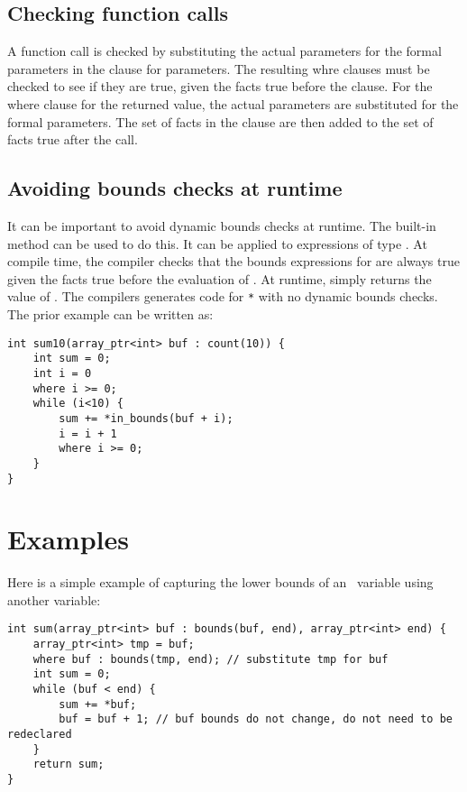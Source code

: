 \subsection{Checking function calls}

A function call is checked by substituting the actual parameters for the
formal parameters in the  clause for parameters.  The
resulting whre clauses must be checked to see if they are true, given
the facts true before the clause.  For the where clause for the returned
value, the actual parameters are substituted for the formal parameters.
The set of facts in the clause are then added to the set of facts true
after the call.

\subsection{Avoiding bounds checks at runtime}
\label{section:avoiding-bounds-checks}

It can be important to avoid dynamic bounds checks at runtime. The
built-in method  can be used to do this. It can be applied
to expressions of type \arrayptr. At compile time, the compiler
checks that the bounds expressions for  are always true given the
facts true before the evaluation of . At runtime, 
simply returns the value of . The compilers generates code for
\texttt{*} with no dynamic bounds checks. The prior example
can be written as:

\begin{verbatim}
int sum10(array_ptr<int> buf : count(10)) {
    int sum = 0;
    int i = 0
    where i >= 0;
    while (i<10) {
        sum += *in_bounds(buf + i);
        i = i + 1
        where i >= 0;
    }
}
\end{verbatim}

\section{Examples}

Here is a simple example of capturing the lower bounds of an
\arrayptr\ variable using another variable:

\begin{verbatim}
int sum(array_ptr<int> buf : bounds(buf, end), array_ptr<int> end) {
    array_ptr<int> tmp = buf;
    where buf : bounds(tmp, end); // substitute tmp for buf
    int sum = 0;
    while (buf < end) {
        sum += *buf;   
        buf = buf + 1; // buf bounds do not change, do not need to be redeclared
    }
    return sum;
}
\end{verbatim}

